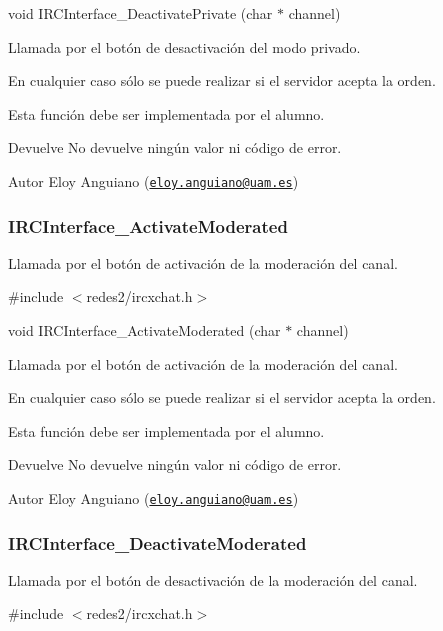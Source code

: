 void I\-R\-C\-Interface\-\_\-\-Deactivate\-Private (char $\ast$ channel)

Llamada por el botón de desactivación del modo privado.

En cualquier caso sólo se puede realizar si el servidor acepta la orden.

Esta función debe ser implementada por el alumno.

\begin{DoxyReturn}{Devuelve}
No devuelve ningún valor ni código de error.
\end{DoxyReturn}
\begin{DoxyAuthor}{Autor}
Eloy Anguiano (\href{mailto:eloy.anguiano@uam.es}{\tt eloy.\-anguiano@uam.\-es})
\end{DoxyAuthor}


 \hypertarget{IRCInterface_ActivateModerated}{}\subsubsection{I\-R\-C\-Interface\-\_\-\-Activate\-Moderated}\label{IRCInterface_ActivateModerated}
Llamada por el botón de activación de la moderación del canal.

\#include $<$redes2/ircxchat.\-h$>$

void I\-R\-C\-Interface\-\_\-\-Activate\-Moderated (char $\ast$ channel)

Llamada por el botón de activación de la moderación del canal.

En cualquier caso sólo se puede realizar si el servidor acepta la orden.

Esta función debe ser implementada por el alumno.

\begin{DoxyReturn}{Devuelve}
No devuelve ningún valor ni código de error.
\end{DoxyReturn}
\begin{DoxyAuthor}{Autor}
Eloy Anguiano (\href{mailto:eloy.anguiano@uam.es}{\tt eloy.\-anguiano@uam.\-es})
\end{DoxyAuthor}


 \hypertarget{IRCInterface_DeactivateModerated}{}\subsubsection{I\-R\-C\-Interface\-\_\-\-Deactivate\-Moderated}\label{IRCInterface_DeactivateModerated}
Llamada por el botón de desactivación de la moderación del canal.

\#include $<$redes2/ircxchat.\-h$>$

